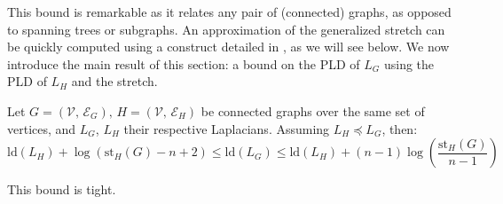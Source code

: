 This bound is remarkable as it relates any pair of (connected) graphs,
as opposed to spanning trees or subgraphs. An approximation of the
generalized stretch can be quickly computed using a construct detailed
in \cite{Spielman2009}, as we will see below. We now introduce the
main result of this section: a bound on the PLD of $L_{G}$ using
the PLD of $L_{H}$ and the stretch. 
\begin{theorem}
\label{thm:stretch-pld-bounds}Let $G=\left(\mathcal{V},\,\mathcal{E}_{G}\right),\, H=\left(\mathcal{V},\,\mathcal{E}_{H}\right)$
be connected graphs over the same set of vertices, and $L_{G}$, $L_{H}$
their respective Laplacians. Assuming $L_{H}\preceq L_{G}$, then:
\begin{equation}
\text{ld}\left(L_{H}\right)+\log\left(\text{st}_{H}\left(G\right)-n+2\right)\leq\text{ld}\left(L_{G}\right)\leq\text{ld}\left(L_{H}\right)+\left(n-1\right)\log\left(\frac{\text{st}_{H}\left(G\right)}{n-1}\right)\label{eq:encadrement-1}
\end{equation}


This bound is tight.\end{theorem}
